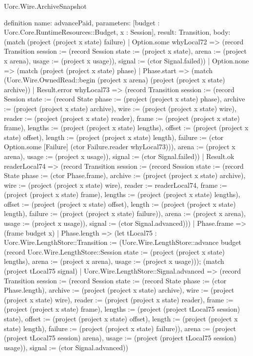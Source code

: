 \begin{lexlean}{Uorc.Wire.ArchiveSnapshot}
\begin{semanticmodule}
definition{
  name: advancePaid,
  parameters: [budget : Uorc.Core.RuntimeResources::Budget, x : Session],
  result: Transition,
  body: (match (project (project x state) failure)
    | Option.some whyLocal72 => (record Transition {session := (record Session {state := (project x state), arena := (project x arena), usage := (project x usage)}), signal := (ctor Signal.failed)})
    | Option.none => (match (project (project x state) phase)
      | Phase.start => (match (Uorc.Wire.OwnedRead::begin (project x arena) (project (project x state) archive))
        | Result.error whyLocal73 => (record Transition {session := (record Session {state := (record State {phase := (project (project x state) phase), archive := (project (project x state) archive), wire := (project (project x state) wire), reader := (project (project x state) reader), frame := (project (project x state) frame), lengths := (project (project x state) lengths), offset := (project (project x state) offset), length := (project (project x state) length), failure := (ctor Option.some [Failure] (ctor Failure.reader whyLocal73))}), arena := (project x arena), usage := (project x usage)}), signal := (ctor Signal.failed)})
        | Result.ok readerLocal74 => (record Transition {session := (record Session {state := (record State {phase := (ctor Phase.frame), archive := (project (project x state) archive), wire := (project (project x state) wire), reader := readerLocal74, frame := (project (project x state) frame), lengths := (project (project x state) lengths), offset := (project (project x state) offset), length := (project (project x state) length), failure := (project (project x state) failure)}), arena := (project x arena), usage := (project x usage)}), signal := (ctor Signal.advanced)}))
      | Phase.frame => (frame budget x)
      | Phase.length => (let tLocal75 : Uorc.Wire.LengthStore::Transition := (Uorc.Wire.LengthStore::advance budget (record Uorc.Wire.LengthStore::Session {state := (project (project x state) lengths), arena := (project x arena), usage := (project x usage)})); (match (project tLocal75 signal)
        | Uorc.Wire.LengthStore::Signal.advanced => (record Transition {session := (record Session {state := (record State {phase := (ctor Phase.length), archive := (project (project x state) archive), wire := (project (project x state) wire), reader := (project (project x state) reader), frame := (project (project x state) frame), lengths := (project (project tLocal75 session) state), offset := (project (project x state) offset), length := (project (project x state) length), failure := (project (project x state) failure)}), arena := (project (project tLocal75 session) arena), usage := (project (project tLocal75 session) usage)}), signal := (ctor Signal.advanced)})
}
\end{semanticmodule}
\end{lexlean}

